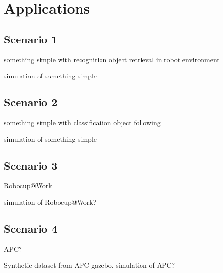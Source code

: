 
\chapter{Applications}
\label{cha:applications}


\section{Scenario 1}
\label{sec:scenario1}

something simple with recognition
object retrieval in robot environment

simulation of something simple


\section{Scenario 2}
\label{sec:scenario2}

something simple with classification
object following

simulation of something simple


\section{Scenario 3}
\label{sec:scenario3}

Robocup@Work

simulation of Robocup@Work?


\section{Scenario 4}
\label{sec:scenario4}

APC?

Synthetic dataset from APC gazebo.
simulation of APC?
